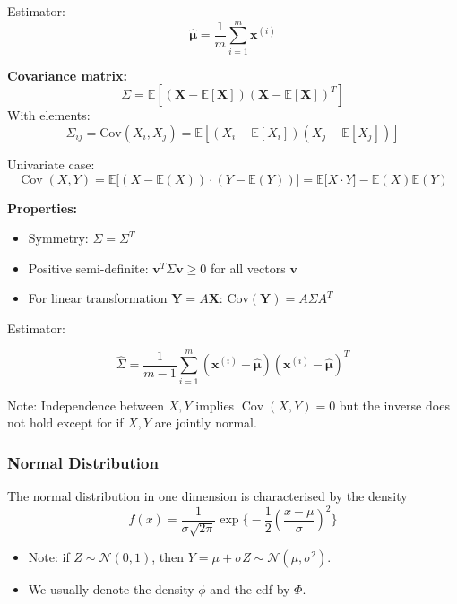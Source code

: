 \documentclass[11pt, %
	oneside, %
	english, %
	onehalfspacing, %
	]{article} %
\numberwithin{equation}{section}
\begin{document}
Estimator:
$$
\hat{\boldsymbol{\mu}} = \frac{1}{m}\sum_{i=1}^m \mathbf{x}^{(i)}
$$


\textbf{Covariance matrix:}
$$
\Sigma = \mathbb{E}[(\mathbf{X} - \mathbb{E}[\mathbf{X}])(\mathbf{X} - \mathbb{E}[\mathbf{X}])^T]
$$
With elements:
$$
\Sigma_{ij} = \text{Cov}(X_i, X_j) = \mathbb{E}[(X_i - \mathbb{E}[X_i])(X_j - \mathbb{E}[X_j])]
$$

Univariate case:
\begin{equation*}
    \operatorname{Cov}(X,Y) = \mathbb{E} \big[ (X - \mathbb{E}(X)) \cdot (Y - \mathbb{E}(Y))  \big] = \mathbb{E} \big[ X \cdot Y \big] - \mathbb{E}(X)\mathbb{E}(Y)
\end{equation*}



\textbf{Properties:}
\begin{itemize}
	\item Symmetry: $\Sigma = \Sigma^T$
	\item Positive semi-definite: $\mathbf{v}^T\Sigma\mathbf{v} \geq 0$ for all vectors $\mathbf{v}$
	\item For linear transformation $\mathbf{Y} = A\mathbf{X}$: $\text{Cov}(\mathbf{Y}) = A\Sigma A^T$
\end{itemize}

Estimator:

$$
\hat{\Sigma} = \frac{1}{m-1}\sum_{i=1}^m (\mathbf{x}^{(i)} - \hat{\boldsymbol{\mu}})(\mathbf{x}^{(i)} - \hat{\boldsymbol{\mu}})^T
$$

Note: Independence between $X, Y$ implies $\operatorname{Cov}(X,Y) = 0$ but the inverse does not hold except for if $X,Y$ are jointly normal.

\subsubsection{Normal Distribution}

The normal distribution in one dimension is characterised by the density
\begin{equation*}
    f(x)=\frac{1}{\sigma \sqrt{2 \pi}} \exp \bigg\{-\frac{1}{2}\left(\frac{x-\mu}{\sigma}\right)^2\bigg\}
\end{equation*}

\begin{itemize}
    \item Note: if $Z \sim \mathcal{N}(0,1)$, then $Y = \mu + \sigma Z \sim \mathcal{N}(\mu, \sigma^2)$.
    \item We usually denote the density $\phi$ and the cdf by $\Phi$.
\end{itemize}
\end{document}
